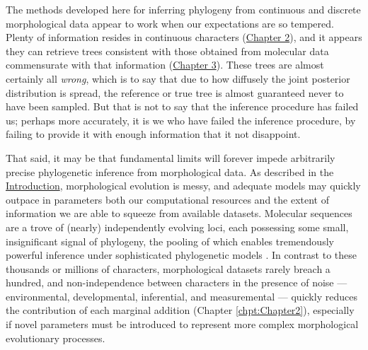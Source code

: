 The methods developed here for inferring phylogeny from continuous and discrete morphological data appear to work when our expectations are so tempered. Plenty of information resides in continuous characters (\hyperref[chpt:Chapter2]{Chapter 2}), and it appears they can retrieve trees consistent with those obtained from molecular data commensurate with that information (\hyperref[chpt:Chapter3]{Chapter 3}). These trees are almost certainly all \textit{wrong}, which is to say that due to how diffusely the joint posterior distribution is spread, the reference or true tree is almost guaranteed never to have been sampled. But that is not to say that the inference procedure has failed us; perhaps more accurately, it is we who have failed the inference procedure, by failing to provide it with enough information that it not disappoint.

That said, it may be that fundamental limits will forever impede arbitrarily precise phylogenetic inference from morphological data. As described in the \hyperref[chpt:Chapter1]{Introduction}, morphological evolution is messy, and adequate models may quickly outpace in parameters both our computational resources and the extent of information we are able to squeeze from available datasets. Molecular sequences are a trove of (nearly) independently evolving loci, each possessing some small, insignificant signal of phylogeny, the pooling of which enables tremendously powerful inference under sophisticated phylogenetic models \citep{kapliPhylogeneticTreeBuilding2020}. In contrast to these thousands or millions of characters, morphological datasets rarely breach a hundred, and non-independence between characters in the presence of noise --- environmental, developmental, inferential, and measuremental --- quickly reduces the contribution of each marginal addition (Chapter \ref{chpt:Chapter2}), especially if novel parameters must be introduced to represent more complex morphological evolutionary processes. 

